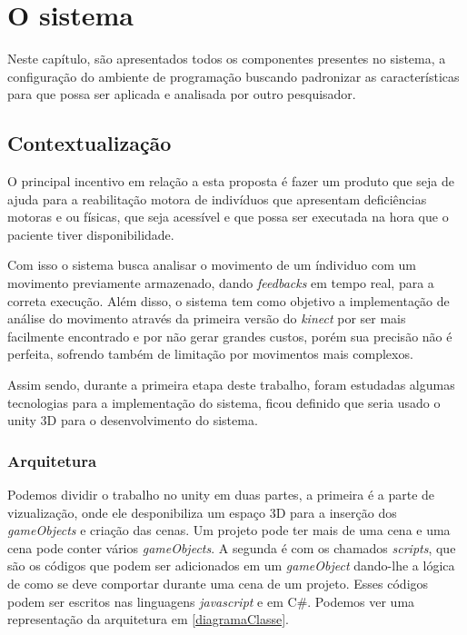 \chapter[O sistema]{O sistema}
Neste capítulo, são apresentados todos os componentes presentes no sistema,
 a configuração do ambiente de programação buscando padronizar as características para que possa ser aplicada e analisada por outro pesquisador.

\section{Contextualização}
  O principal incentivo em relação a esta proposta é fazer um produto que seja de ajuda
para a reabilitação motora  de indivíduos que apresentam deficiências motoras e ou físicas, que seja acessível e
que possa ser executada na hora que o paciente tiver disponibilidade.

  Com isso o sistema busca analisar o movimento de um índividuo com um movimento previamente
armazenado, dando \textit{feedbacks} em tempo real, para a correta execução. Além disso,
o sistema tem como objetivo a implementação de análise do movimento através da primeira
versão do \textit{kinect} por ser mais facilmente encontrado e por não gerar grandes custos, porém
sua precisão não é perfeita, sofrendo também de limitação por movimentos mais complexos.

Assim sendo, durante a primeira etapa deste trabalho,  foram estudadas algumas tecnologias para a implementação do sistema,
 ficou definido que seria usado o unity 3D para o desenvolvimento do sistema.

\subsection{Arquitetura}\label{sub:arquitetura}
  Podemos dividir o trabalho no unity em duas partes,
a primeira é a parte de vizualização, onde ele desponibiliza um espaço 3D para a inserção dos \textit{gameObjects} e criação das cenas. Um projeto pode
ter mais de uma cena e uma cena pode conter vários \textit{gameObjects}. A segunda é com os chamados \textit{scripts}, que são os códigos que podem
ser adicionados em um \textit{gameObject} dando-lhe a lógica de como se deve comportar durante uma cena de um projeto. Esses códigos podem ser escritos
nas linguagens \textit{javascript} e em C\#. Podemos ver uma representação da arquitetura em \ref{diagramaClasse}.


